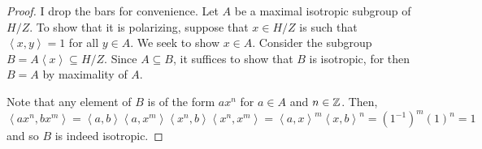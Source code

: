 \begin{proof}
	I drop the bars for convenience. Let $A$ be a maximal isotropic subgroup of $H/Z$. To show that it is polarizing, suppose that $x \in H/Z$ is such that $\left<x,y\right> = 1$ for all $y \in A$. We seek to show $x \in A$. Consider the subgroup $B = A\left<x\right> \subseteq H/Z$. Since $A \subseteq B$, it suffices to show that $B$ is isotropic, for then $B = A$ by maximality of $A$.
	
	Note that any element of $B$ is of the form $ax^n$ for $a \in A$ and $n \in \mathbb{Z}$. Then,
	\[ \left<ax^n,bx^m\right> = \left<a,b\right>\left<a,x^m\right>\left<x^n,b\right>\left<x^n,x^m\right> = \left<a,x\right>^m\left<x,b\right>^n = (1^{-1})^m(1)^n = 1 \]
	and so $B$ is indeed isotropic.
\end{proof}
